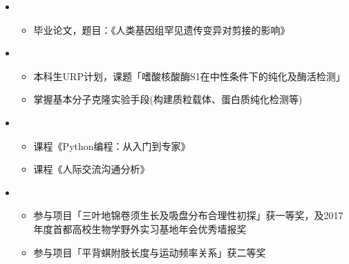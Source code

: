   \begin{itemize}[leftmargin=*]
    \item
      {\small
      \begin{itemize}
        \item 毕业论文，题目：《人类基因组罕见遗传变异对剪接的影响》
      \end{itemize}
      }
    \item
      {\small
      \begin{itemize}
        \item 本科生URP计划，课题「嗜酸核酸酶S1在中性条件下的纯化及酶活检测」
        \item 掌握基本分子克隆实验手段(构建质粒载体、蛋白质纯化检测等)
      \end{itemize}
      }
    \item
      {\small
      \begin{itemize}
        \item 课程《Python编程：从入门到专家》
        \item 课程《人际交流沟通分析》
      \end{itemize}
      }
    \item
      {\small
      \begin{itemize}
        \item 参与项目「三叶地锦卷须生长及吸盘分布合理性初探」获一等奖，及2017年度首都高校生物学野外实习基地年会优秀墙报奖
        \item 参与项目「平背蜞附肢长度与运动频率关系」获二等奖
      \end{itemize}
      }
  \end{itemize}